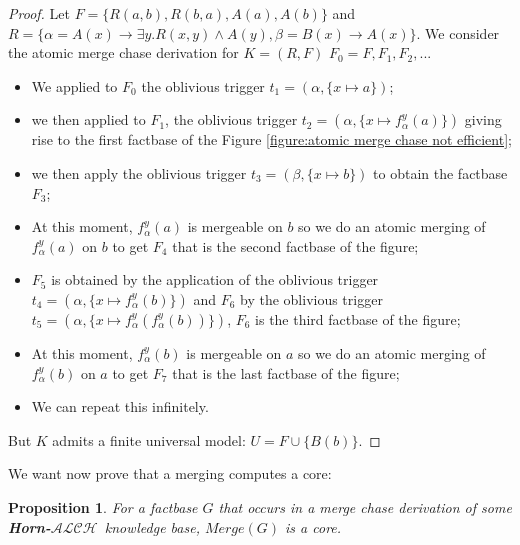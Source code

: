 \documentclass{article}
\newtheorem{proposition}{Proposition}[section]
\theoremstyle{definition}
\theoremstyle{remark}
\newcommand{\Merge}{\textit{Merge}}
\newcommand{\ALCH}{\textbf{Horn-$\mathcal{ALCH}$}}
\begin{document}
\begin{proof} 
Let $F= \{R(a,b),R(b,a),A(a),A(b)\}$ and $R = \{\alpha = A(x) \rightarrow \exists y.R(x,y) \wedge A(y), \beta = B(x) \rightarrow A(x)\}$. We consider the atomic merge chase derivation for $K=(R,F)$ $F_0 =F,F_1,F_2,...$
\begin{itemize}

\item We applied to $F_0$ the oblivious trigger $t_1 = (\alpha, \{x \mapsto a\})$;
\item we then applied to $F_1$, the oblivious trigger $t_2 = (\alpha, \{x \mapsto f_\alpha^y(a)\})$ giving rise to the first factbase of the Figure \ref{figure:atomic merge chase not efficient};
\item we then apply the oblivious trigger $t_3 = (\beta, \{x \mapsto b\})$ to obtain the factbase $F_3$;
\item At this moment, $f_\alpha^y(a)$ is mergeable on $b$ so we do an atomic merging of $f_\alpha^y(a)$ on $b$ to get $F_4$ that is the second factbase of the figure;
\item $F_5$ is obtained by the application of the oblivious trigger $t_4 = (\alpha, \{x \mapsto f_\alpha^y(b)\})$ and $F_6$ by the oblivious trigger $t_5 = (\alpha, \{x \mapsto f_\alpha^y(f_\alpha^y(b))\})$, $F_6$ is the third factbase of the figure;
\item At this moment, $f_\alpha^y(b)$ is mergeable on $a$ so we do an atomic merging of $f_\alpha^y(b)$ on $a$ to get $F_7$ that is the last factbase of the figure; 
\item We can repeat this infinitely. 

\end{itemize} 
 But $K$ admits a finite universal model: $U = F \cup \{B(b)\}$. 




\end{proof}



We want now prove that a merging computes a core:

\begin{proposition} \label{core}
For a factbase $G$ that occurs in a merge chase derivation of some \ALCH\ knowledge base, $\Merge(G)$ is a core.
\end{proposition}
\end{document}
